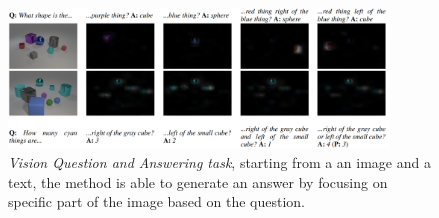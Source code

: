 \begin{figure}[t]
    \centering
    \includegraphics[width=0.9\textwidth]{figures/images/film/film_attention.png}
    \caption{\textit{Vision Question and Answering task}, starting from a an image and a text, the method is able to generate an answer by focusing on specific part of the image based on the question.}
    \label{fig:film_attention}
\end{figure}
